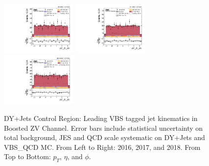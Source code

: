 \begin{figure}[!ht]
  \includegraphics[width=0.335\textwidth]{analysis_plots/2016_zv/cr_vjets_l/vbf_j1_phi.pdf} \hspace{-10pt}
  \includegraphics[width=0.335\textwidth]{analysis_plots/2017_zv/cr_vjets_l/vbf_j1_phi.pdf} \hspace{-10pt}
  \includegraphics[width=0.335\textwidth]{analysis_plots/2018_zv/cr_vjets_l/vbf_j1_phi.pdf} \hspace{-10pt} \\
  \caption[DY+Jets Control Region: Leading VBS tagged jet kinematics in Boosted ZV Channel]%
  {DY+Jets Control Region: Leading VBS tagged jet kinematics in Boosted ZV Channel.
    Error bars include statistical uncertainty on total background,
    JES and QCD scale systematic on DY+Jets and VBS\_QCD MC\@. From Left to Right: 2016,
    2017, and 2018. From Top to Bottom: \( p_T \), \( \eta \), and \( \phi \).}%
  \label{fig:zv-cr-vjets-l-vbs1-pt-eta-m}
\end{figure}


